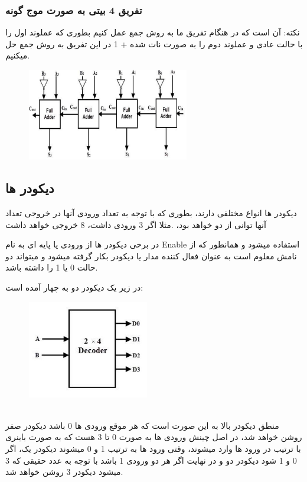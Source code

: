 \documentclass[20pt, a4paper]{article}
\begin{document}
\subsubsection{تفریق 4 بیتی به صورت موج گونه}
نکته:
آن است که در هنگام تفریق ما به روش جمع عمل کنیم بطوری که عملوند اول را با حالت عادی
و عملوند دوم را به صورت نات شده + 1 در این تفریق به روش جمع حل میکنیم.

\begin{figure}[htbp]\centering
	\centerline{\includegraphics[width=200pt]{img/lastest/4bitSubtractor.jpg}}
\end{figure}


\newpage

\subsection{دیکودر ها}
دیکودر ها انواع مختلفی دارند، بطوری که با توجه به تعداد ورودی آنها 
در خروجی تعداد آنها توانی از دو خواهد بود، 
.مثلا اگر 3 ورودی داشت، 8 خروجی خواهد داشت

در برخی دیکودر ها از ورودی یا پایه ای به نام 
Enable 
استفاده میشود و همانطور که از نامش معلوم است 
به عنوان فعال کننده مدار یا دیکودر بکار گرفته میشود و میتواند دو حالت 0 یا 1 را داشته باشد.

در زیر یک دیکودر دو به چهار آمده است:
\begin{figure}[htbp]\centering
	\centerline{\includegraphics[width=150pt]{img/lastest/2to4Decoder.jpg}}
\end{figure}\\
منطق دیکودر بالا به این صورت است که هر موقع ورودی ها 0 باشد دیکودر 
صفر روشن خواهد شد، در اصل چینش ورودی ها به صورت 0 تا 3 هست که به صورت 
باینری با ترتیب در ورود ها وارد میشوند،
وقتی ورود ها به ترتیب 1 و 0 میشوند دیکودر یک، اگر 0 و 1 شود دیکودر دو و در نهایت
اگر هر دو ورودی 1 باشد با توجه به عدد حقیقی که 3 میشود دیکودر 3 روشن خواهد شد.\\
\end{document}
